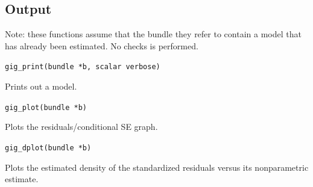 \documentclass[a4paper,11pt]{article}
\newenvironment{funcdoc}[1]
{\noindent\hrulefill\newline\texttt{#1}\par\noindent\hrulefill\par\medskip\par}
{\bigskip}
\begin{document}
\subsection{Output}
\label{sec:syntax_output}

Note: these functions assume that the bundle they refer to contain a
model that has already been estimated. No checks is performed.

\begin{funcdoc}{gig\_print(bundle *b, scalar verbose)}
  Prints out a model.
\end{funcdoc}

\begin{funcdoc}{gig\_plot(bundle *b)}
  Plots the residuals/conditional SE graph.
\end{funcdoc}

\begin{funcdoc}{gig\_dplot(bundle *b)}
  Plots the estimated density of the standardized residuals versus its
  nonparametric estimate.
\end{funcdoc}

\clearpage
\end{document}
